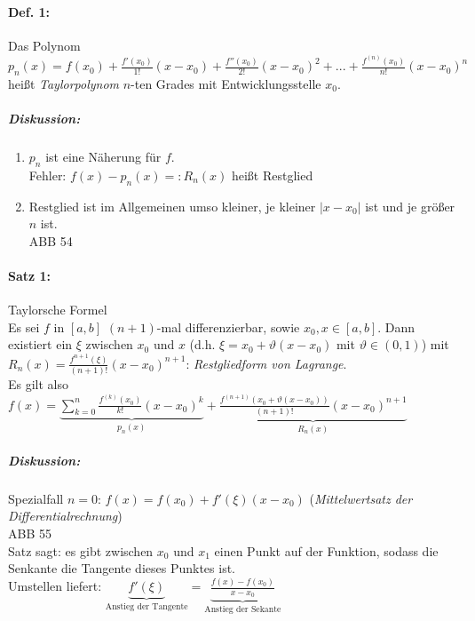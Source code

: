\paragraph{Def. 1:} Das Polynom $p_n(x)=f(x_0)+\frac{f'(x_0)}{1!}(x-x_0)+\frac{f''(x_0)}{2!}(x-x_0)^2+...+\frac{f^{(n)}(x_0)}{n!}(x-x_0)^n$ heißt \emph{Taylorpolynom} $n$-ten Grades mit Entwicklungsstelle $x_0$.

\subparagraph{Diskussion:} 
\begin{enumerate}
\item $p_n$ ist eine Näherung für $f$.\\
Fehler: $f(x)-p_n(x)=: R_n(x)$ heißt Restglied
\item Restglied ist im Allgemeinen umso kleiner, je kleiner $|x-x_0|$ ist und je größer $n$ ist.\\
ABB 54
\end{enumerate}
\paragraph{Satz 1:} Taylorsche Formel\\
Es sei $f$ in $[a,b]$ $(n+1)$-mal differenzierbar, sowie $x_0,x \in [a,b]$. Dann existiert ein $\xi$ zwischen $x_0$ und $x$ (d.h. $\xi = x_0 + \vartheta (x-x_0)$ mit $\vartheta \in (0,1)$) mit $R_n (x) = \frac{f^{n+1}(\xi)}{(n+1)!}(x-x_0)^{n+1}$: \emph{Restgliedform von Lagrange}.\\
Es gilt also $f(x) = \underbrace{\sum_{k=0}^n \frac{f^{(k)}(x_0)}{k!}(x-x_0)^k}_{p_n(x)} +\underbrace{\frac{f^{(n+1)}(x_0+\vartheta(x-x_0))}{(n+1)!}(x-x_0)^{n+1}}_{R_n(x)}$
\subparagraph{Diskussion:}
Spezialfall $n=0$: $f(x)=f(x_0)+f'(\xi)(x-x_0)$ (\emph{Mittelwertsatz der Differentialrechnung})\\
ABB 55\\
Satz sagt: es gibt zwischen $x_0$ und $x_1$ einen Punkt auf der Funktion, sodass die Senkante die Tangente dieses Punktes ist. \\
Umstellen liefert: $\underbrace{f'(\xi)}_{\text{Anstieg der Tangente}}= \underbrace{\frac{f(x)-f(x_0)}{x-x_0}}_{\text{Anstieg der Sekante}}$


